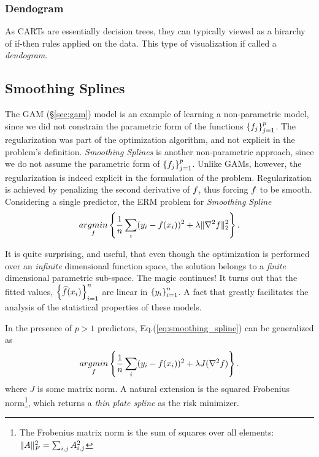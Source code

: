 \subsubsection{Dendogram}
\label{sec:dendogram}
As CARTs are essentially decision trees, they can typically viewed as a hirarchy of if-then rules applied on the data.
This type of visualization if called a \emph{dendogram}.







\subsection{Smoothing Splines}
\label{sec:smoothing_splines}
The GAM (\S\ref{sec:gam}) model is an example of learning a non-parametric model, since we did not constrain the parametric form of the functions $\left\{ f_j \right\}_{j=1}^p$. The regularization was part of the optimization algorithm, and not explicit in the problem's definition.
\emph{Smoothing Splines} is another non-parametric approach, since we do not assume the parametric form of $\left\{ f_j \right\}_{j=1}^p$. 
Unlike GAMs, however, the regularization is indeed explicit in the formulation of the problem. 
Regularization is achieved by penalizing the second derivative of $f$, thus forcing $f$ to be smooth. 
Considering a single predictor, the ERM problem for \emph{Smoothing Spline}
\begin{align}
\label{eq:smoothing_spline}
	 \mathop{argmin} _{f}\left\{ \frac{1}{n}\sum_i (y_i-f(x_i))^2 + \lambda \Vert \nabla^2 f \Vert_2^2   \right\}.
\end{align}

It is quite surprising, and useful, that even though the optimization is performed over an \emph{infinite} dimensional function space, the solution belongs to a \emph{finite } dimensional parametric sub-space. 
The magic continues! It turns out that the fitted values, $\left\{ \widehat{f}(x_i) \right\}_{i=1}^n$ are linear in $\left\{ y_i \right\}_{i=1}^n$. A fact that greatly facilitates the analysis of the statistical properties of these models.

In the presence of $p>1$ predictors, Eq.(\ref{eq:smoothing_spline}) can be generalized as 
\begin{align}
\label{eq:smoothing_spline_multi}
	 \mathop{argmin} _{f}\left\{ \frac{1}{n}\sum_i (y_i-f(x_i))^2 + \lambda J(\nabla^2 f)   \right\}.
\end{align}
where $J$ is some matrix norm. A natural extension is the squared Frobenius norm\footnote{The Frobenius matrix norm is the sum of squares over all elements: $\Vert A \Vert^2_F=\sum_{i,j} A_{i,j}^2$ }, which returns a \emph{thin plate spline} as the risk minimizer.




